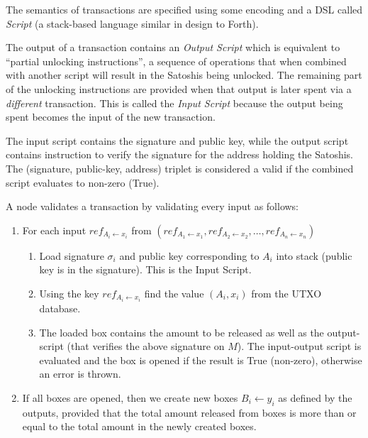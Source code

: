 \documentclass[]{report}   %
\newcommand{\la}{\leftarrow}
\newcommand{\lea}{\leftarrow}
\begin{document}
The semantics of transactions are specified using some encoding and a DSL called {\em Script} (a stack-based language similar in design to Forth). 

The output of a transaction contains an {\em Output Script} which is equivalent to ``partial unlocking instructions'', a sequence of operations that when combined with another script will result in the Satoshis being unlocked. The remaining part of the unlocking instructions are provided when that output is later spent via a {\em different} 
transaction. This is called the {\em Input Script} because the output being spent becomes the input of the new transaction. 

The input script contains the signature and public key, while the output script contains instruction to verify the signature for the address holding the Satoshis. The (signature, public-key, address) triplet is considered a valid if the combined script evaluates to non-zero (True).

%

A node validates a transaction by validating every input as follows:


\begin{enumerate}
  \item	For each input $ref_{A_i\lea x_i}$ from $(ref_{A_1\leftarrow x_1}, ref_{A_2\leftarrow x_2}, \ldots, ref_{A_n\leftarrow x_n})$
	
	\begin{enumerate}
		\item Load signature $\sigma_i$ and public key corresponding to $A_i$ into stack (public key is in the signature). This is the Input Script.
		\item Using the key $ref_{A_i \lea x_i}$ find the value $(A_{i},  x_i)$ from the UTXO database. %
		\item The loaded box contains the amount to be released as well as the output-script (that verifies the above signature on $M$). The input-output script is evaluated and the box is opened if the result is True (non-zero), otherwise an error is thrown.
	\end{enumerate}
	\item If all boxes are opened, then we create new boxes $B_i\la y_i$ as defined by the outputs, provided that the total amount released from boxes is more than or equal to the total amount in the newly created boxes. 
\end{enumerate}
\end{document}
